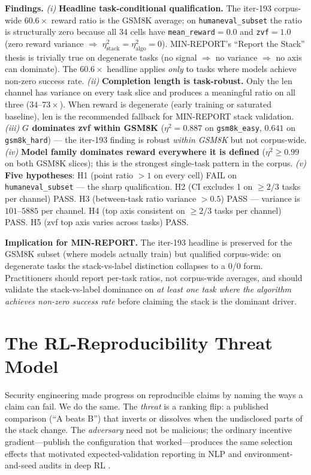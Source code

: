 \documentclass{article}  \usepackage[preprint,nonatbib]{neurips_2026} \usepackage[numbers]{natbib}
\begin{document}
\textbf{Findings.}
\textit{(i)} \textbf{Headline task-conditional qualification.} The
iter-193 corpus-wide $60.6\times$ reward ratio is the GSM8K average;
on \texttt{humaneval\_subset} the ratio is structurally zero because
all $34$ cells have \texttt{mean\_reward}$=0.0$ and
\texttt{zvf}$=1.0$ (zero reward variance $\Rightarrow$
$\eta^2_{\text{stack}}=\eta^2_{\text{algo}}=0$). MIN-REPORT's
``Report the Stack'' thesis is trivially true on degenerate tasks
(no signal $\Rightarrow$ no variance $\Rightarrow$ no axis can
dominate). The $60.6\times$ headline applies \emph{only} to tasks
where models achieve non-zero success rate. \textit{(ii)}
\textbf{Completion length is task-robust.} Only the len channel has
variance on every task slice and produces a meaningful ratio on all
three ($34$--$73\times$). When reward is degenerate (early training
or saturated baseline), len is the recommended fallback for
MIN-REPORT stack validation. \textit{(iii)} \textbf{$G$ dominates
zvf within GSM8K} ($\eta^2=0.887$ on \texttt{gsm8k\_easy}, $0.641$
on \texttt{gsm8k\_hard}) --- the iter-193 finding is robust
\emph{within GSM8K} but not corpus-wide. \textit{(iv)}
\textbf{Model family dominates reward everywhere it is defined}
($\eta^2\ge 0.99$ on both GSM8K slices); this is the strongest
single-task pattern in the corpus. \textit{(v)} \textbf{Five
hypotheses}: H1 (point ratio $>1$ on every cell) FAIL on
\texttt{humaneval\_subset} --- the sharp qualification. H2 (CI
excludes 1 on $\ge 2/3$ tasks per channel) PASS. H3 (between-task
ratio variance $>0.5$) PASS --- variance is $101$--$5885$ per
channel. H4 (top axis consistent on $\ge 2/3$ tasks per channel)
PASS. H5 (zvf top axis varies across tasks) PASS.

\textbf{Implication for MIN-REPORT.} The iter-193 headline is
preserved for the GSM8K subset (where models actually train) but
qualified corpus-wide: on degenerate tasks the stack-vs-label
distinction collapses to a 0/0 form. Practitioners should report
per-task ratios, not corpus-wide averages, and should validate the
stack-vs-label dominance on \emph{at least one task where the
algorithm achieves non-zero success rate} before claiming the stack
is the dominant driver. \section{The RL-Reproducibility Threat Model}
\label{sec:p5-threat}
Security engineering made progress on reproducible claims by naming the ways a
claim can fail. We do the same. The \emph{threat} is a ranking flip: a
published comparison (``A beats B'') that inverts or dissolves when the
undisclosed parts of the stack change. The \emph{adversary} need not be
malicious; the ordinary incentive gradient---publish the configuration that
worked---produces the same selection effects that motivated expected-validation
reporting in NLP \citep{dodge2019show} and environment-and-seed audits in deep
RL \citep{henderson2018deep}.
\end{document}
